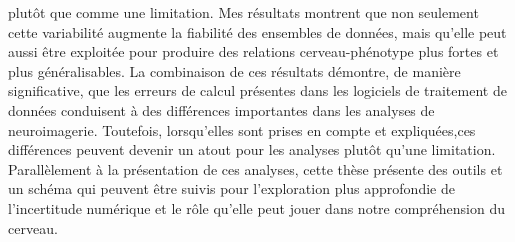 plutôt que comme une limitation.  Mes résultats montrent que non seulement cette variabilité augmente la
fiabilité des ensembles de données, mais qu'elle peut aussi être exploitée pour produire des relations
cerveau-phénotype plus fortes et plus généralisables. La combinaison de ces résultats démontre, de manière
significative, que les erreurs de calcul présentes dans les logiciels de traitement de données conduisent
à des différences importantes dans les analyses de neuroimagerie. Toutefois, lorsqu'elles sont prises en
compte et expliquées,ces différences peuvent devenir un atout pour les analyses plutôt qu'une limitation.
Parallèlement à la présentation de ces analyses, cette thèse présente des outils et un schéma qui peuvent
être suivis pour l'exploration plus approfondie de l'incertitude numérique et le rôle qu'elle peut jouer
dans notre compréhension du cerveau.
